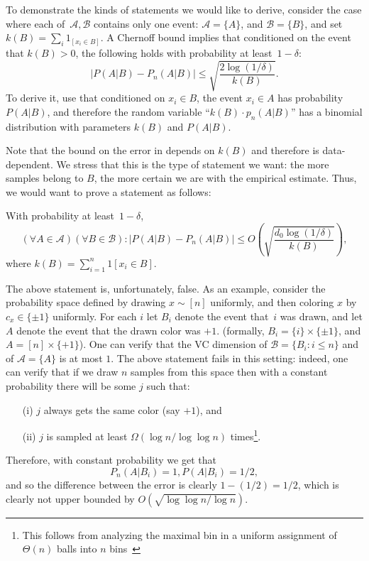 \documentclass{article}
\def\B{{\mathcal B}}
\newcommand{\cA}{\mathcal{A}}
\newcommand{\cB}{\mathcal{B}}
\begin{document}
To demonstrate the kinds of statements we would like to derive,
consider the case where each of~$\cA,\cB$ contains only one event:
$\cA=\{A\}$, and $\cB=\{B\}$,
and set $k(B)=\sum_i 1_{[x_i\in B]}$.
A Chernoff bound implies that conditioned on the event that $k(B)>0$, 
the following holds with probability at least~$1-\delta$:
\begin{equation}\label{eq:chernoff}
\left\lvert P(A\vert B) - P_n(A \vert B) \right\rvert \leq \sqrt{\frac{2\log(1/\delta)}{k(B)}}.
\end{equation}
To derive it, use that conditioned on $x_i\in B$, the event $x_i\in A$ has probability $P(A\vert B)$, 
and therefore the random variable ``$k(B)\cdot p_n(A \vert B)$'' has a binomial distribution with parameters $k(B)$ and $P(A\vert B)$.

Note that the bound on the error in  depends on $k(B)$ and therefore is data-dependent.
We stress that this is the type of statement we want:
the more samples belong to $B$, the more certain we are with the empirical estimate.
Thus, we would want to prove a statement as follows:

With probability at least~$1-\delta$,
\[\left(\forall A\in\cA\right)\left(\forall B\in\B\right):\left\lvert P(A \vert B) - P_n(A \vert B) \right\rvert \leq O\left(\sqrt{\frac{d_0 \log(1/\delta)}{k(B)}}\right),\]
where $k(B) = \sum_{i=1}^n 1[x_i\in B]$.

The above statement is, unfortunately, false. 
As an example, consider the probability space defined by drawing $x \sim[n]$ uniformly,
and then coloring $x$ by $c_x\in\{\pm 1\}$ uniformly.
For each $i$ let $B_i$ denote the event that~$i$ was drawn,
and let $A$ denote the event that the drawn color was  $+1$.
(formally, $B_i = \{i\}\times\{\pm 1\}$, and $A=[n]\times\{+1\}$).
One can verify that the VC dimension of $\B=\{B_i : i\leq n\}$ and of $\cA=\{A\}$ is at most $1$.
The above statement fails in this setting:
indeed, one can verify that if we draw $n$ samples from this space 
then with a constant probability there will be some  $j$
such that: 
\begin{itemize}
\item[(i)] $j$ always gets the same color (say $+1$), and 
\item[(ii)] $j$ is sampled at least $\Omega(\log n/\log\log n)$ times\footnote{{This follows from analyzing the maximal bin
in a uniform assignment of $\Theta(n)$ balls into $n$ bins~\cite{bins}}}.
\end{itemize}
Therefore, with constant probability we get that 
\[P_n(A\vert B_i) = 1, P(A\vert B_i)=1/2,\]
and so the difference between the error is clearly $1-(1/2)=1/2$,
which is clearly not upper bounded by $O(\sqrt{\log\log n/\log n})$.
\end{document}
